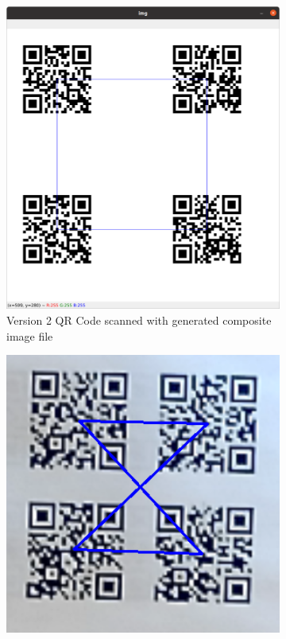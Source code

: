 \documentclass[12pt]{article}
\begin{document}
\begin{figure}[H]
    \centering
    \begin{subfigure}{0.4\textwidth}
        \includegraphics[width=1\textwidth]{images/figures/fig7a}
        \caption{Version 2 QR Code scanned with generated composite image file}
        \label{fig:qrcodea}
    \end{subfigure}
    \begin{subfigure}{0.4\textwidth}
        \includegraphics[width=1\textwidth]{images/figures/fig7b}

\end{subfigure}
\end{figure}
\end{document}
